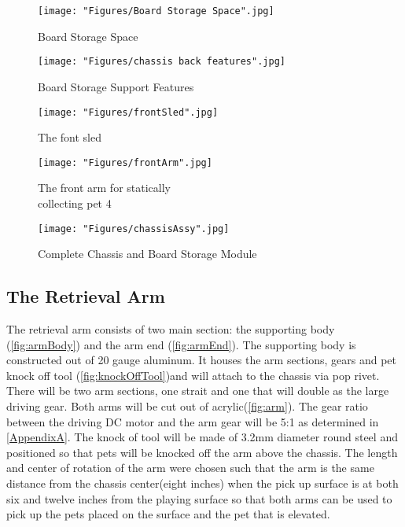 \documentclass[11pt, oneside]{article} %
\begin{document}
		\newpage
		\begin{figure}[ht]
			\centering
			\begin{minipage}[t]{.5\textwidth}
				\centering
				\texttt{[image: "Figures/Board Storage Space".jpg]}
				\caption[Board Storage Space]{Board Storage Space}
				\label{fig:2}
			\end{minipage}%
			\begin{minipage}[t]{.5\textwidth}
				\centering
				\texttt{[image: "Figures/chassis back features".jpg]}
				\caption[Board Storage Support Features]{Board Storage Support Features}
				\label{fig:3}
			\end{minipage}
		\end{figure}
		
		\begin{figure}[!ht]
			\begin{minipage}[t]{.5\textwidth}
				\centering
				\texttt{[image: "Figures/frontSled".jpg]}
				\caption[The Sled]{The font sled}
				\label{fig:front sled}
			\end{minipage}%
			\begin{minipage}[t]{.75\textwidth}
				\centering
				\texttt{[image: "Figures/frontArm".jpg]}
				\caption[Front Arm]{The front arm for statically \\ collecting pet 4}
				\label{fig:front arm}
			\end{minipage}
		\end{figure}
		
		\begin{figure}[ht]
			\centering
			\texttt{[image: "Figures/chassisAssy".jpg]}
			\caption[Complete Chassis and Board Storage Module]{Complete Chassis and Board Storage Module}
			\label{fig:chassisAssy}
		\end{figure}
	
	\newpage	
	\subsection{The Retrieval Arm}
	The retrieval arm consists of two main section: the supporting body (\autoref{fig:armBody}) and the arm end (\autoref{fig:armEnd}). The supporting body is constructed out of 20 gauge aluminum. It houses the arm sections, gears and pet knock off tool (\autoref{fig:knockOffTool})and will attach to the chassis via pop rivet. There will be two arm sections, one strait and one that will double as the large driving gear. Both arms will be cut out of acrylic(\autoref{fig:arm}). The gear ratio between the driving DC motor and the arm gear will be 5:1 as determined in \autoref{AppendixA}. The knock of tool will be made of 3.2mm diameter round steel and positioned so that pets will be knocked off the arm above the chassis. The length and center of rotation of the arm were chosen such that the arm is the same distance from the chassis center(eight inches) when the pick up surface is at both six and twelve inches from the playing surface so that both arms can be used to pick up the pets placed on the surface and the pet that is elevated.
	
\end{document}
